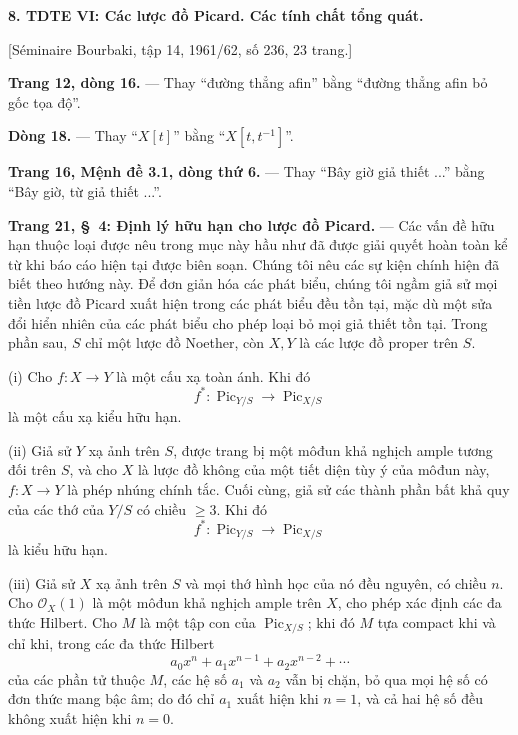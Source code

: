 \documentclass[11pt,twoside,openany]{book}
\numberwithin{equation}{section}
\newcommand{\src}[1]{%
  \phantomsection\hypertarget{src:\fgasourceid:#1}{}%
  \marginpar{\raggedleft\footnotesize\sffamily #1}%
}
\newcommand{\fgasourceid}{unset}
\begin{document}
\noindent\textbf{8. TDTE VI: Các lược đồ Picard. Các tính chất tổng quát.}

\begin{center}
[Séminaire Bourbaki, tập 14, 1961/62, số 236, 23 trang.]
\end{center}

\noindent\textbf{Trang 12, dòng 16.} --- Thay ``đường thẳng afin'' bằng
``đường thẳng afin bỏ gốc tọa độ''.

\noindent\textbf{Dòng 18.} --- Thay ``$X[t]$'' bằng
``$X[t,t^{-1}]$''.

\noindent\textbf{Trang 16, Mệnh đề 3.1, dòng thứ 6.} --- Thay ``Bây giờ giả
thiết ...'' bằng ``Bây giờ, từ giả thiết ...''.

\noindent\textbf{Trang 21, §~4: Định lý hữu hạn cho lược đồ Picard.} --- Các
vấn đề hữu hạn thuộc loại được nêu trong mục này hầu như đã được giải quyết
hoàn toàn kể từ khi báo cáo hiện tại được biên soạn. Chúng tôi nêu các sự kiện
chính hiện đã biết theo hướng này. Để đơn giản hóa các phát biểu, chúng tôi
ngầm giả sử mọi tiền lược đồ Picard xuất hiện trong các phát biểu đều tồn tại,
mặc dù một sửa đổi hiển nhiên của các phát biểu cho phép loại bỏ mọi giả
thiết tồn tại. Trong phần sau, $S$ chỉ một lược đồ Noether, còn $X,Y$ là các
lược đồ proper trên $S$.

\medskip
\noindent(i) Cho $f:X\longrightarrow Y$ là một cấu xạ toàn ánh. Khi đó
\[
f^*: \operatorname{Pic}_{Y/S}\longrightarrow\operatorname{Pic}_{X/S}
\]
là một cấu xạ kiểu hữu hạn.

\src{304}
\noindent(ii) Giả sử $Y$ xạ ảnh trên $S$, được trang bị một môđun khả nghịch
ample tương đối trên $S$, và cho $X$ là lược đồ không của một tiết diện tùy ý
của môđun này, $f:X\longrightarrow Y$ là phép nhúng chính tắc. Cuối cùng, giả
sử các thành phần bất khả quy của các thớ của $Y/S$ có chiều $\geq3$. Khi đó
\[
f^*: \operatorname{Pic}_{Y/S}\longrightarrow\operatorname{Pic}_{X/S}
\]
là kiểu hữu hạn.

\noindent(iii) Giả sử $X$ xạ ảnh trên $S$ và mọi thớ hình học của nó đều
nguyên, có chiều $n$. Cho $\mathcal O_X(1)$ là một môđun khả nghịch ample trên
$X$, cho phép xác định các đa thức Hilbert. Cho $M$ là một tập con của
$\operatorname{Pic}_{X/S}$; khi đó $M$ tựa compact khi và chỉ khi, trong các
đa thức Hilbert
\[
a_0x^n+a_1x^{n-1}+a_2x^{n-2}+\cdots
\]
của các phần tử thuộc $M$, các hệ số $a_1$ và $a_2$ vẫn bị chặn, bỏ qua mọi hệ số có đơn thức mang bậc âm; do đó chỉ $a_1$ xuất hiện khi $n=1$, và cả hai hệ số đều không xuất hiện khi $n=0$.
\end{document}
